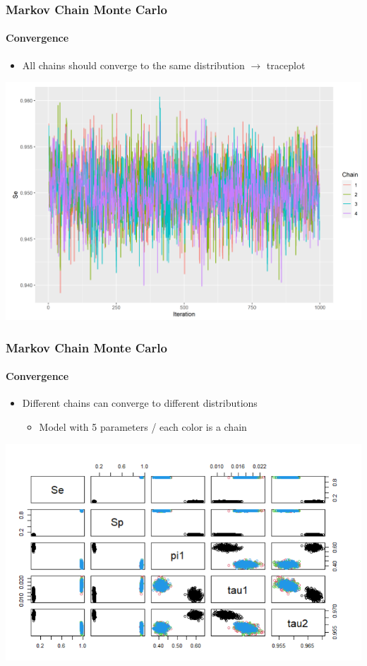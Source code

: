 \documentclass{beamer}
\begin{document}
\begin{frame}
\frametitle{Markov Chain Monte Carlo}
\framesubtitle{Convergence}
\begin{itemize}
 \item{All chains should converge to the same distribution $\rightarrow$ traceplot}
\end{itemize}
\includegraphics[width=\textwidth]{imgs/traceplot.png}
\end{frame}

\begin{frame}
\frametitle{Markov Chain Monte Carlo}
\framesubtitle{Convergence}
\begin{itemize}
 \item{Different chains can converge to different distributions}
 \begin{itemize}
  \item{Model with 5 parameters / each color is a chain}
 \end{itemize}
\end{itemize}
\includegraphics[width=\textwidth]{imgs/Stan_fail_1.png}
\end{frame}
\end{document}
